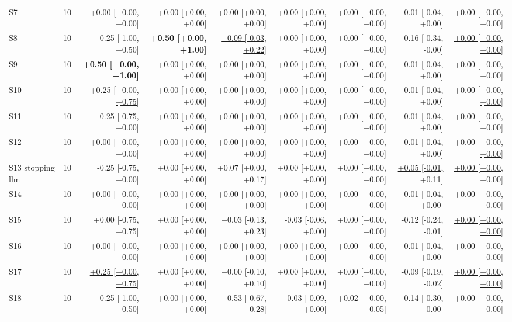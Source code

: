 \begin{table}[t]
\begin{adjustbox}{max width=\textwidth}
\begin{tabular}{@{}lrrrrrrrr@{}}
S7 & 10 & +0.00 [+0.00, +0.00] & +0.00 [+0.00, +0.00] & +0.00 [+0.00, +0.00] & +0.00 [+0.00, +0.00] & +0.00 [+0.00, +0.00] & -0.01 [-0.04, +0.00] & \underline{+0.00 [+0.00, +0.00]} \\
S8 & 10 & -0.25 [-1.00, +0.50] & \textbf{+0.50 [+0.00, +1.00]} & \underline{+0.09 [-0.03, +0.22]} & +0.00 [+0.00, +0.00] & +0.00 [+0.00, +0.00] & -0.16 [-0.34, -0.00] & \underline{+0.00 [+0.00, +0.00]} \\
S9 & 10 & \textbf{+0.50 [+0.00, +1.00]} & +0.00 [+0.00, +0.00] & +0.00 [+0.00, +0.00] & +0.00 [+0.00, +0.00] & +0.00 [+0.00, +0.00] & -0.01 [-0.04, +0.00] & \underline{+0.00 [+0.00, +0.00]} \\
S10 & 10 & \underline{+0.25 [+0.00, +0.75]} & +0.00 [+0.00, +0.00] & +0.00 [+0.00, +0.00] & +0.00 [+0.00, +0.00] & +0.00 [+0.00, +0.00] & -0.01 [-0.04, +0.00] & \underline{+0.00 [+0.00, +0.00]} \\
S11 & 10 & -0.25 [-0.75, +0.00] & +0.00 [+0.00, +0.00] & +0.00 [+0.00, +0.00] & +0.00 [+0.00, +0.00] & +0.00 [+0.00, +0.00] & -0.01 [-0.04, +0.00] & \underline{+0.00 [+0.00, +0.00]} \\
S12 & 10 & +0.00 [+0.00, +0.00] & +0.00 [+0.00, +0.00] & +0.00 [+0.00, +0.00] & +0.00 [+0.00, +0.00] & +0.00 [+0.00, +0.00] & -0.01 [-0.04, +0.00] & \underline{+0.00 [+0.00, +0.00]} \\
S13 stopping llm & 10 & -0.25 [-0.75, +0.00] & +0.00 [+0.00, +0.00] & +0.07 [+0.00, +0.17] & +0.00 [+0.00, +0.00] & +0.00 [+0.00, +0.00] & \underline{+0.05 [-0.01, +0.11]} & \underline{+0.00 [+0.00, +0.00]} \\
S14 & 10 & +0.00 [+0.00, +0.00] & +0.00 [+0.00, +0.00] & +0.00 [+0.00, +0.00] & +0.00 [+0.00, +0.00] & +0.00 [+0.00, +0.00] & -0.01 [-0.04, +0.00] & \underline{+0.00 [+0.00, +0.00]} \\
S15 & 10 & +0.00 [-0.75, +0.75] & +0.00 [+0.00, +0.00] & +0.03 [-0.13, +0.23] & -0.03 [-0.06, +0.00] & +0.00 [+0.00, +0.00] & -0.12 [-0.24, -0.01] & \underline{+0.00 [+0.00, +0.00]} \\
S16 & 10 & +0.00 [+0.00, +0.00] & +0.00 [+0.00, +0.00] & +0.00 [+0.00, +0.00] & +0.00 [+0.00, +0.00] & +0.00 [+0.00, +0.00] & -0.01 [-0.04, +0.00] & \underline{+0.00 [+0.00, +0.00]} \\
S17 & 10 & \underline{+0.25 [+0.00, +0.75]} & +0.00 [+0.00, +0.00] & +0.00 [-0.10, +0.10] & +0.00 [+0.00, +0.00] & +0.00 [+0.00, +0.00] & -0.09 [-0.19, -0.02] & \underline{+0.00 [+0.00, +0.00]} \\
S18 & 10 & -0.25 [-1.00, +0.50] & +0.00 [+0.00, +0.00] & -0.53 [-0.67, -0.28] & -0.03 [-0.09, +0.00] & +0.02 [+0.00, +0.05] & -0.14 [-0.30, -0.00] & \underline{+0.00 [+0.00, +0.00]} \\

\end{tabular}
\end{adjustbox}
\end{table}
